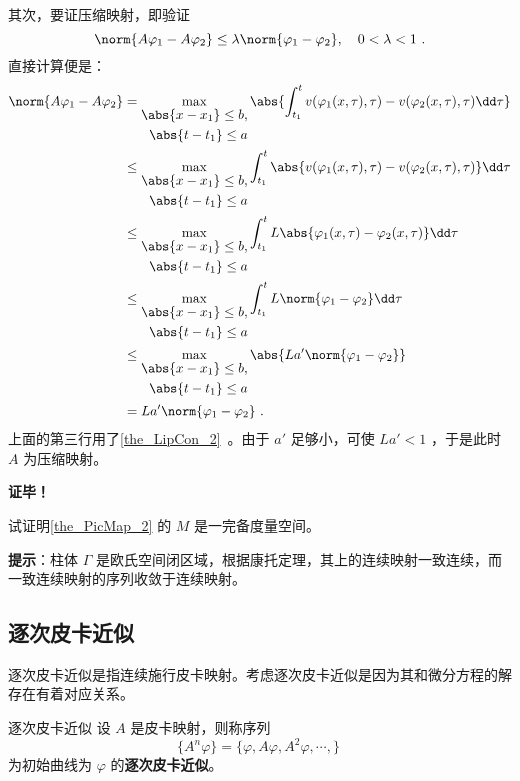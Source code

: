 其次，要证压缩映射，即验证 
\begin{equation}
\norm{A\varphi_1-A\varphi_2}\leq\lambda\norm{\varphi_1-\varphi_2},\quad 0<\lambda<1~.
\end{equation}
直接计算便是：
\begin{equation}
\begin{aligned}
\norm{A\varphi_1-A\varphi_2}&=\max_{\begin{aligned}\abs{x-x_1}\leq b,\\\abs{t-t_1}\leq a\end{aligned}}\abs{\int_{t_1}^t v(\varphi_1(x,\tau),\tau)-v(\varphi_2(x,\tau),\tau)\dd \tau}\\
&\leq\max_{\begin{aligned}\abs{x-x_1}\leq b,\\\abs{t-t_1}\leq a\end{aligned}}\int_{t_1}^t \abs{v(\varphi_1(x,\tau),\tau)-v(\varphi_2(x,\tau),\tau)}\dd \tau\\
&\leq \max_{\begin{aligned}\abs{x-x_1}\leq b,\\\abs{t-t_1}\leq a\end{aligned}}\int_{t_1}^t L\abs{\varphi_1(x,\tau)-\varphi_2(x,\tau)}\dd \tau\\
&\leq \max_{\begin{aligned}\abs{x-x_1}\leq b,\\\abs{t-t_1}\leq a\end{aligned}}\int_{t_1}^t L\norm{\varphi_1-\varphi_2}\dd \tau\\
&\leq\max_{\begin{aligned}\abs{x-x_1}\leq b,\\\abs{t-t_1}\leq a\end{aligned}}\abs{ La'\norm{\varphi_1-\varphi_2}}\\
&= La'\norm{\varphi_1-\varphi_2}~.
\end{aligned}
\end{equation}
上面的第三行用了\autoref{the_LipCon_2}~。由于 $a'$ 足够小，可使 $La'<1$ ，于是此时 $A$ 为压缩映射。

\textbf{证毕！}
\begin{exercise}{}\label{exe_PicMap_1}{}
试证明\autoref{the_PicMap_2} 的 $M$ 是一完备度量空间。
\end{exercise}
\textbf{提示}：柱体 $\Gamma$ 是欧氏空间闭区域，根据康托定理，其上的连续映射一致连续，而一致连续映射的序列收敛于连续映射。
\subsection{逐次皮卡近似}
逐次皮卡近似是指连续施行皮卡映射。考虑逐次皮卡近似是因为其和微分方程的解存在有着对应关系。
\begin{definition}{逐次皮卡近似}
设 $A$ 是皮卡映射，则称序列
\begin{equation}
\{A^n\varphi\}=\{\varphi, A\varphi, A^2\varphi,\cdots,\}~ 
\end{equation}
为初始曲线为 $\varphi$ 的\textbf{逐次皮卡近似}。
\end{definition}

